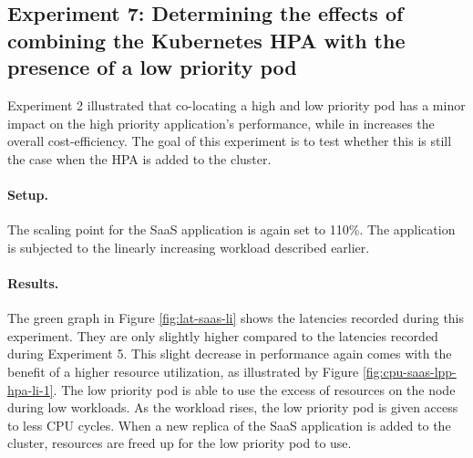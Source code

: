 \subsection{Experiment 7: Determining the effects of combining the Kubernetes HPA with the presence of a low priority pod}
Experiment 2 illustrated that co-locating a high and low priority pod has a minor impact on the high priority application's performance, while in increases the overall cost-efficiency. The goal of this experiment is to test whether this is still the case when the HPA is added to the cluster. 

\paragraph{Setup.}
The scaling point for the SaaS application is again set to 110\%. The application is subjected to the linearly increasing workload described earlier.


\paragraph{Results.}
The green graph in Figure \ref{fig:lat-saas-li} shows the latencies recorded during this experiment. They are only slightly higher compared to the latencies recorded during Experiment 5. This slight decrease in performance again comes with the benefit of a higher resource utilization, as illustrated by Figure \ref{fig:cpu-saas-lpp-hpa-li-1}. The low priority pod is able to use the excess of resources on the node during low workloads. As the workload rises, the low priority pod is given access to less CPU cycles. When a new replica of the SaaS application is added to the cluster, resources are freed up for the low priority pod to use. 

